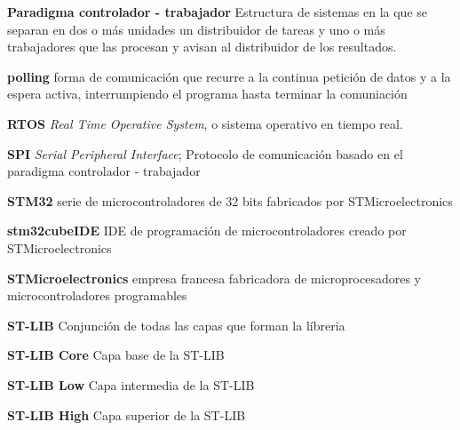 \documentclass{report}
\begin{document}
\textbf{Paradigma controlador - trabajador} Estructura de sistemas en la que se separan en dos o más unidades un distribuidor de tareas y uno o más trabajadores que las procesan y avisan al distribuidor de los resultados. 
\par \vspace{0.2 cm}
\textbf{polling} forma de comunicación que recurre a la continua petición de datos y a la espera activa, interrumpiendo el programa hasta terminar la comuniación
\par \vspace{0.2 cm}
\textbf{RTOS} \textit{Real Time Operative System}, o sistema operativo en tiempo real.  
\par \vspace{0.2 cm}
\textbf{SPI} \textit{Serial Peripheral Interface}; Protocolo de comunicación basado en el paradigma controlador - trabajador
\par \vspace{0.2 cm}
\textbf{STM32} serie de microcontroladores de 32 bits fabricados por STMicroelectronics
\par \vspace{0.2 cm}
\textbf{stm32cubeIDE} IDE de programación de microcontroladores creado por STMicroelectronics
\par \vspace{0.2 cm}
\textbf{STMicroelectronics} empresa francesa fabricadora de microprocesadores y microcontroladores programables
\par \vspace{0.2 cm}
\textbf{ST-LIB} Conjunción de todas las capas que forman la líbreria
\par \vspace{0.2 cm}
\textbf{ST-LIB Core} Capa base de la ST-LIB
\par \vspace{0.2 cm}
\textbf{ST-LIB Low} Capa intermedia de la ST-LIB
\par \vspace{0.2 cm}
\textbf{ST-LIB High} Capa superior de la ST-LIB

\newpage
\end{document}
